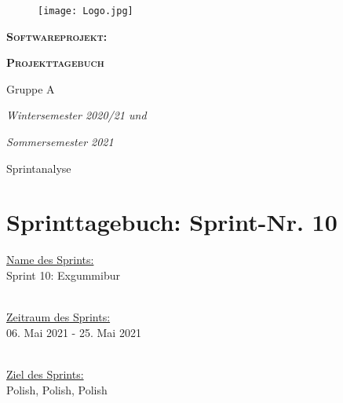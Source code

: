\documentclass[12pt,a4paper, oneside]{article}
\author{Uni Oldenburg, SWP2020 Gruppe A}
\begin{document}
    \begin{titlepage}
        \pagestyle{empty}
        \begin{center}

            \begin{figure}[h]
                \centering
                \texttt{[image: Logo.jpg]}
            \end{figure}

            \bigskip \bigskip \noindent
            \textsc{\textbf{\LARGE Softwareprojekt:}} \par \bigskip \noindent
            \textsc{\textbf{\LARGE Projekttagebuch}}

            \par \bigskip \bigskip \bigskip \bigskip \bigskip \noindent
            {\Large Gruppe A} \par \medskip \noindent

            \par \bigskip \bigskip \bigskip \bigskip \bigskip \bigskip \noindent
            \textit{\Large Wintersemester 2020/21 und} \par \noindent
            \textit{\Large Sommersemester 2021}

            \par \bigskip \bigskip \bigskip \bigskip \bigskip \bigskip \noindent
            \par \bigskip \bigskip \bigskip \noindent
            {\Large Sprintanalyse} \par \medskip \noindent

        \end{center}
    \end{titlepage}

    \tableofcontents
    \pagebreak


    \section{Sprinttagebuch: Sprint-Nr. 10}
    \underline{Name des Sprints:}
    \\
    Sprint 10: Exgummibur

    \noindent
    \\
    \underline{Zeitraum des Sprints:}
    \\
    06. Mai 2021 - 25. Mai 2021

    \noindent
    \\
    \underline{Ziel des Sprints:}
    \\
    Polish, Polish, Polish
\end{document}
